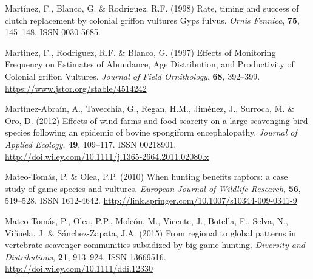 \documentclass[12pt]{article}
\begin{document}
\begin{thebibliography}{87}
	Mart{\'{i}}nez, F., Blanco, G. \& Rodr{\'{i}}guez, R.F. (1998)
	{Rate, timing and success of clutch replacement by colonial griffon vultures
		Gyps fulvus}.
	\newblock \emph{Ornis Fennica}, \textbf{75}, 145--148.
	\newblock ISSN 0030-5685.
	
	Martinez, F., Rodriguez, R.F. \& Blanco, G. (1997) {Effects of Monitoring
		Frequency on Estimates of Abundance, Age Distribution, and Productivity of
		Colonial griffon Vultures}.
	\newblock \emph{Journal of Field Ornithology}, \textbf{68}, 392--399.
	\newline\urlprefix\url{https://www.jstor.org/stable/4514242}
	
	Mart{\'{i}}nez-Abra{\'{i}}n, A., Tavecchia, G., Regan, H.M., Jim{\'{e}}nez, J.,
	Surroca, M. \& Oro, D. (2012) {Effects of wind farms and food scarcity on a
		large scavenging bird species following an epidemic of bovine spongiform
		encephalopathy}.
	\newblock \emph{Journal of Applied Ecology}, \textbf{49}, 109--117.
	\newblock ISSN 00218901.
	\newline\urlprefix\url{http://doi.wiley.com/10.1111/j.1365-2664.2011.02080.x}
	
	Mateo-Tom{\'{a}}s, P. \& Olea, P.P. (2010) {When hunting benefits raptors: a
		case study of game species and vultures}.
	\newblock \emph{European Journal of Wildlife Research}, \textbf{56}, 519--528.
	\newblock ISSN 1612-4642.
	\newline\urlprefix\url{http://link.springer.com/10.1007/s10344-009-0341-9}
	
	Mateo-Tom{\'{a}}s, P., Olea, P.P., Mole{\'{o}}n, M., Vicente, J., Botella, F.,
	Selva, N., Vi{\~{n}}uela, J. \& S{\'{a}}nchez-Zapata, J.A. (2015) {From
		regional to global patterns in vertebrate scavenger communities subsidized by
		big game hunting}.
	\newblock \emph{Diversity and Distributions}, \textbf{21}, 913--924.
	\newblock ISSN 13669516.
	\newline\urlprefix\url{http://doi.wiley.com/10.1111/ddi.12330}
	

\end{thebibliography}
\end{document}
